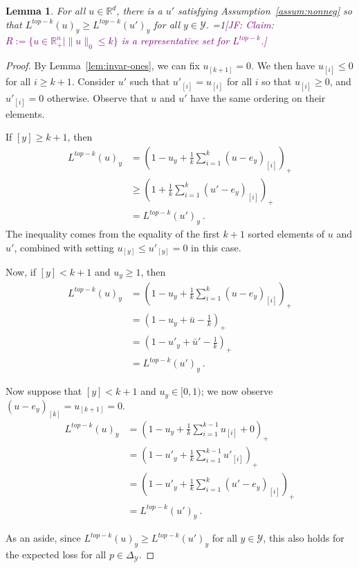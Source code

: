 \documentclass[12pt]{article}
\newcommand{\Comments}{1}
\newcommand{\mynote}[2]{\ifnum\Comments=1\textcolor{#1}{#2}\fi}
\newcommand{\jessie}[1]{\mynote{purple}{[JF: #1]}}
\newcommand{\reals}{\mathbb{R}}
\newcommand{\simplex}{\Delta_\Y}
\newcommand{\Y}{\mathcal{Y}}
\newtheorem{lemma}{Lemma}
\begin{document}
\begin{lemma}\label{lem:extra-elts-zero}
	For all $u \in \reals^d$, there is a $u'$ satisfying Assumption~\ref{assum:nonneg} so that $L^{top-k}(u)_y \geq L^{top-k}(u')_y$ for all $y \in \Y$.
	\jessie{Claim: $R := \{u \in \reals^n_+ \mid \|u\|_0 \leq k\}$ is a representative set for $L^{top-k}$.}
\end{lemma}
\begin{proof}
	By Lemma~\ref{lem:invar-ones}, we can fix $u_{[k+1]} = 0$.
	We then have $u_{[i]} \leq 0$ for all $i \geq k+1$.
	Consider $u'$ such that $u'_{[i]} = u_{[i]}$ for all $i$ so that $u_{[i]} \geq 0$, and $u'_{[i]} = 0$ otherwise.
	Observe that $u$ and $u'$ have the same ordering on their elements.
	
	If $[y] \geq k+1$, then 
	\begin{align*}
	L^{top-k}(u)_y &= \left(1 - u_y + \frac 1 k \sum_{i=1}^k (u - e_y)_{[i]}\right)_+ \\
	&\geq \left(1 + \frac {1}{k} \sum_{i=1}^k (u' - e_y)_{[i]}\right)_+\\
	&= L^{top-k}(u')_y~.~
	\end{align*}
	The inequality comes from the equality of the first $k+1$ sorted elements of $u$ and $u'$, combined with setting $u_{[y]} \leq u'_{[y]} = 0$ in this case.
	
	Now, if $[y] < k+1$ and $u_y \geq 1$, then 
	\begin{align*}
	L^{top-k}(u)_y &= \left(1 - u_y + \frac 1 k \sum_{i=1}^k (u - e_y)_{[i]}\right)_+ \\
	&= \left(1 - u_y + \bar u - \frac 1 k\right)_+\\
	&= \left(1 - u'_y + \bar u' - \frac 1 k\right)_+\\
	&= L^{top-k}(u')_y~.~
	\end{align*}
	
	Now suppose that $[y] < k+1$ and $u_y \in [0,1)$; we now observe $(u - e_y)_{[k]} = u_{[k+1]} = 0$. 
	\begin{align*}
	L^{top-k}(u)_y &= \left(1 - u_y + \frac 1 k \sum_{i=1}^{k-1} u_{[i]} + 0 \right)_+\\
	&= \left(1 - u'_y + \frac 1 k \sum_{i=1}^{k-1} u'_{[i]}\right)_+\\
	&= \left(1 - u'_y + \frac 1 k \sum_{i=1}^{k} (u' - e_y)_{[i]}\right)_+\\
	&= L^{top-k}(u')_y~.~
	\end{align*}

	As an aside, since $L^{top-k}(u)_y \geq L^{top-k}(u')_y$ for all $y \in \Y$, this also holds for the expected loss for all $p \in \simplex$.
\end{proof}
\end{document}

